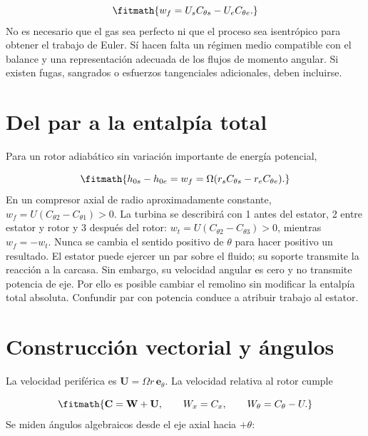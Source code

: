 \documentclass[10pt,openany]{book}
\begin{document}
\[
\fitmath{w_f=U_s C_{\theta s}-U_e C_{\theta e}.}
\]
No es necesario que el gas sea perfecto ni que el proceso sea isentrópico para obtener el trabajo de Euler. Sí hacen falta un régimen medio compatible con el balance y una representación adecuada de los flujos de momento angular. Si existen fugas, sangrados o esfuerzos tangenciales adicionales, deben incluirse.

\section{Del par a la entalpía total}


Para un rotor adiabático sin variación importante de energía potencial,



\[
\fitmath{h_{0s}-h_{0e}=w_f=\Omega(r_sC_{\theta s}-r_eC_{\theta e}).}
\]
En un compresor axial de radio aproximadamente constante, \(w_f=U(C_{\theta 2}-C_{\theta 1})>0\). La turbina se describirá con 1 antes del estator, 2 entre estator y rotor y 3 después del rotor: \(w_t=U(C_{\theta 2}-C_{\theta 3})>0\), mientras \(w_f=-w_t\). Nunca se cambia el sentido positivo de \(\theta\) para hacer positivo un resultado.
El estator puede ejercer un par sobre el fluido; su soporte transmite la reacción a la carcasa. Sin embargo, su velocidad angular es cero y no transmite potencia de eje. Por ello es posible cambiar el remolino sin modificar la entalpía total absoluta. Confundir par con potencia conduce a atribuir trabajo al estator.

\section{Construcción vectorial y ángulos}

La velocidad periférica es \(\mathbf U=\Omega r\,\mathbf e_\theta\). La velocidad relativa al rotor cumple

\[
\fitmath{\mathbf C=\mathbf W+\mathbf U,\qquad W_x=C_x,\qquad W_\theta=C_\theta-U.}
\]
Se miden ángulos algebraicos desde el eje axial hacia \(+\theta\):
\end{document}
